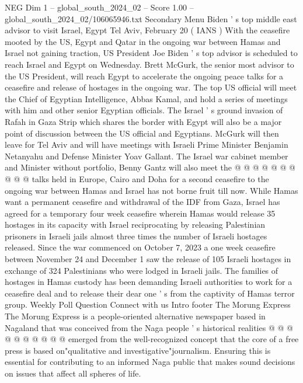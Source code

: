 \begin{textsample}{NEG Dim 1 – global\_south\_2024\_02 – Score 1.00 – global\_south\_2024\_02/106065946.txt}  \label{ex:f1_neg_422}
Secondary Menu Biden ' s top middle east advisor to visit Israel, Egypt Tel Aviv, February 20 ( IANS ) With the ceasefire mooted by the US, Egypt and Qatar in the ongoing war between Hamas and Israel not gaining traction, US President Joe Biden ' s top advisor is scheduled to reach Israel and Egypt on Wednesday.
Brett McGurk, the senior most advisor to the US President, will reach Egypt to accelerate the ongoing peace talks for a ceasefire and release of hostages in the ongoing war.
The top US official will meet the Chief of Egyptian Intelligence, Abbas Kamal, and hold a series of meetings with him and other senior Egyptian officials.
The Israel ' s ground invasion of Rafah in Gaza Strip which shares the border with Egypt will also be a major point of discussion between the US official and Egyptians.
McGurk will then leave for Tel Aviv and will have meetings with Israeli Prime Minister Benjamin Netanyahu and Defense Minister Yoav Gallant.
The Israel war cabinet member and Minister without portfolio, Benny Gantz will also meet the @ @ @ @ @ @ @ @ @ @ talks held in Europe, Cairo and Doha for a second ceasefire to the ongoing war between Hamas and Israel has not borne fruit till now.
While Hamas want a permanent ceasefire and withdrawal of the IDF from Gaza, Israel has agreed for a temporary four week ceasefire wherein Hamas would release 35 hostages in its capacity with Israel reciprocating by releasing Palestinian prisoners in Israeli jails almost three times the number of Israeli hostages released.
Since the war commenced on October 7, 2023 a one week ceasefire between November 24 and December 1 saw the release of 105 Israeli hostages in exchange of 324 Palestinians who were lodged in Israeli jails.
The families of hostages in Hamas custody has been demanding Israeli authorities to work for a ceasefire deal and to release their dear one ' s from the captivity of Hamas terror group.
Weekly Poll Question Connect with us Intro footer The Morung Express The Morung Express is a people-oriented alternative newspaper based in Nagaland that was conceived from the Naga people ' s historical realities @ @ @ @ @ @ @ @ @ @ emerged from the well-recognized concept that the core of a free press is based on"qualitative and investigative"journalism.
Ensuring this is essential for contributing to an informed Naga public that makes sound decisions on issues that affect all spheres of life.

\end{textsample}
